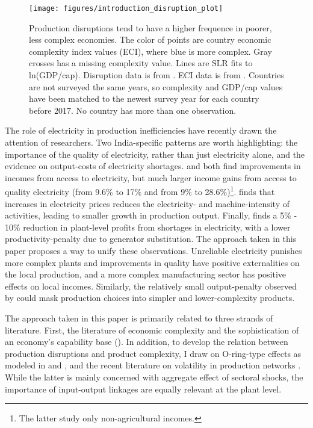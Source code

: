 \documentclass[11pt]{article}
\begin{document}
\begin{figure}[htpb]
	\centering
	\texttt{[image: figures/introduction\_disruption\_plot]}
	\caption{Production disruptions tend to have a higher frequence in poorer, less complex economies. The color of points are country economic complexity index values (ECI), where blue is more complex. Gray crosses has a missing complexity value. Lines are SLR fits to ln(GDP/cap). Disruption data is from \cite{world_bank_enterprise_2020}. ECI data is from \cite{simoes_economic_2011}. Countries are not surveyed the same years, so complexity and GDP/cap values have been matched to the newest survey year for each country before 2017. No country has more than one observation.}
	\label{fig:disruption-fig}
\end{figure}

The role of electricity in production inefficiencies have recently drawn the attention of researchers. Two India-specific patterns are worth highlighting: the importance of the quality of electricity, rather than just electricity alone, and the evidence on output-costs of electricity shortages. \cite{samad_benefits_2016} and \cite{chakravorty_does_2014} both find improvements in incomes from access to electricity, but much larger income gains from access to quality electricity (from 9.6\% to 17\% and from 9\% to 28.6\%)\footnote{The latter study only non-agricultural incomes.}. \cite{abeberese_electricity_2017} finds that increases in electricity prices reduces the electricity- and machine-intensity of activities, leading to smaller growth in production output. Finally, \cite{allcott_how_2016} finds a 5\% - 10\% reduction in plant-level profits from shortages in electricity, with a lower productivity-penalty due to generator substitution. The approach taken in this paper proposes a way to unify these observations. Unreliable electricity punishes more complex plants and improvements in quality have positive externalities on the local production, and a more complex manufacturing sector has positive effects on local incomes. Similarly, the relatively small output-penalty observed by \cite{allcott_how_2016} could mask production choices into simpler and lower-complexity products.

The approach taken in this paper is primarily related to three strands of literature. First, the literature of economic complexity and the sophistication of an economy's capability base  (\citealp{frenken_related_2007,hausmann_atlas_2013,tacchella_new_2012}). In addition, to develop the relation between production disruptions and product complexity, I draw on O-ring-type effects as modeled in \cite{kremer_o-ring_1993} and \cite{jones_intermediate_2011}, and the recent literature on volatility in production networks \citep{acemoglu_network_2012}. While the latter is mainly concerned with aggregate effect of sectoral shocks, the importance of input-output linkages are equally relevant at the plant level.
\end{document}
